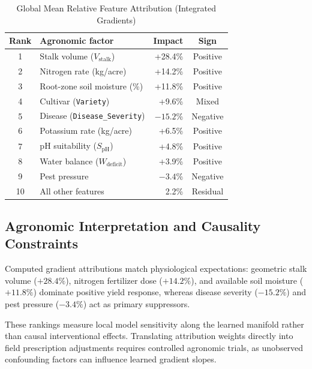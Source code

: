 \documentclass[conference,10pt,letterpaper]{IEEEtran}
\begin{document}
\begin{table}[htbp]
\caption{Global Mean Relative Feature Attribution (Integrated Gradients)}
\label{tab:attributions}
\centering
\footnotesize
\setlength{\tabcolsep}{3.5pt}
\begin{tabular*}{\columnwidth}{@{\extracolsep{\fill}}clrc@{}}
\toprule
\textbf{Rank} & \textbf{Agronomic factor} & \textbf{Impact} & \textbf{Sign} \\
\midrule
1  & Stalk volume ($V_{\text{stalk}}$)        & +28.4\% & Positive \\
2  & Nitrogen rate (kg/acre)                  & +14.2\% & Positive \\
3  & Root-zone soil moisture (\%)             & +11.8\% & Positive \\
4  & Cultivar (\texttt{Variety})              & +9.6\%  & Mixed \\
5  & Disease (\texttt{Disease\_Severity})     & $-15.2$\% & Negative \\
6  & Potassium rate (kg/acre)                 & +6.5\%  & Positive \\
7  & pH suitability ($S_{\text{pH}}$)         & +4.8\%  & Positive \\
8  & Water balance ($W_{\text{deficit}}$)     & +3.9\%  & Positive \\
9  & Pest pressure                            & $-3.4$\% & Negative \\
10 & All other features                       & 2.2\%   & Residual \\
\bottomrule
\end{tabular*}
\end{table}

\subsection{Agronomic Interpretation and Causality Constraints}
Computed gradient attributions match physiological expectations: geometric stalk volume ($+28.4\%$), nitrogen fertilizer dose ($+14.2\%$), and available soil moisture ($+11.8\%$) dominate positive yield response, whereas disease severity ($-15.2\%$) and pest pressure ($-3.4\%$) act as primary suppressors. 

These rankings measure local model sensitivity along the learned manifold rather than causal interventional effects. Translating attribution weights directly into field prescription adjustments requires controlled agronomic trials, as unobserved confounding factors can influence learned gradient slopes.
\end{document}
